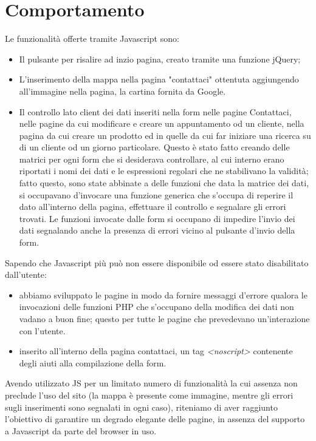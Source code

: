 \section{Comportamento}{
	Le funzionalità offerte tramite Javascript sono: 
	\begin{itemize}\itemsep1pt
		\item Il pulsante per risalire ad inzio pagina, creato tramite una funzione jQuery;
		\item L'inserimento della mappa nella pagina "contattaci" ottentuta aggiungendo all'immagine nella pagina, la cartina fornita da Google.
		\item Il controllo lato client dei dati inseriti nella form nelle pagine Contattaci, nelle pagine da cui modificare e creare un appuntamento od un cliente, nella pagina da cui creare un prodotto ed in quelle da cui far iniziare una ricerca su di un cliente od un giorno particolare. Questo è stato fatto creando delle matrici per ogni form che si desiderava controllare, al cui interno erano riportati i nomi dei dati e le espressioni regolari che ne stabilivano la validità; fatto questo, sono state abbinate a delle funzioni che data la matrice dei dati, si occupavano d'invocare una funzione generica che s'occupa di reperire il dato all'interno della pagina, effettuare il controllo e segnalare gli errori trovati. Le funzioni invocate dalle form si occupano di impedire l'invio dei dati segnalando anche la presenza di errori vicino al pulsante d'invio della form.
	\end{itemize}
	Sapendo che Javascript più può non essere disponibile od essere stato disabilitato dall'utente:
	\begin{itemize}\itemsep1pt
		\item abbiamo sviluppato le pagine in modo da fornire messaggi d'errore qualora le invocazioni delle funzioni PHP che s'occupano della modifica dei dati non vadano a buon fine; questo per tutte le pagine che prevedevano un'interazione con l'utente.
		\item inserito all'interno della pagina contattaci, un tag \textit{<noscript>} contenente degli aiuti alla compilazione della form.
	\end{itemize}
	Avendo utilizzato JS per un limitato numero di funzionalità la cui assenza non preclude l'uso del sito (la mappa è presente come immagine, mentre gli errori sugli inserimenti sono segnalati in ogni caso), riteniamo di aver raggiunto l'obiettivo di garantire un degrado elegante delle pagine, in assenza del supporto a Javascript da parte del browser in uso.
}